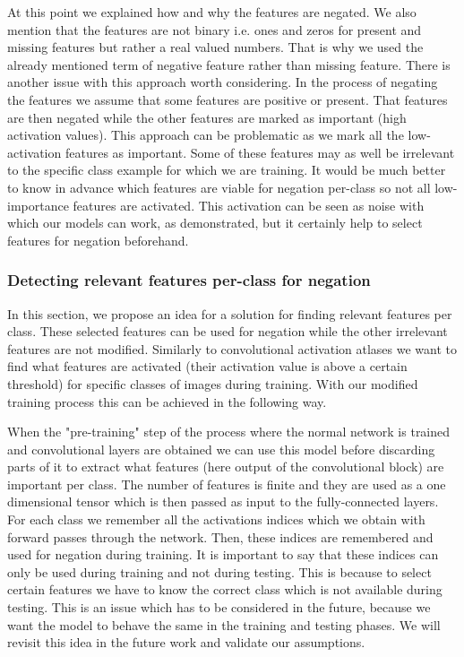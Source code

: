 \documentclass[b5paper]{book}
\begin{document}
At this point we explained how and why the features are negated. We also mention that the features are not binary i.e. ones and zeros for present and missing features but rather a real valued numbers. That is why we used the already mentioned term of negative feature rather than missing feature. There is another issue with this approach worth considering. In the process of negating the features we assume that some features are positive or present. That features are then negated while the other features are marked as important (high activation values). This approach can be problematic as we mark all the low-activation features as important. Some of these features may as well be irrelevant to the specific class example for which we are training. It would be much better to know in advance which features are viable for negation per-class so not all low-importance features are activated. This activation can be seen as noise with which our models can work, as demonstrated, but it certainly help to select features for negation beforehand.  

\subsubsection{Detecting relevant features per-class for negation}

In this section, we propose an idea for a solution for finding relevant features per class. These selected features can be used for negation while the other irrelevant features are not modified. Similarly to convolutional activation atlases we want to find what features are activated (their activation value is above a certain threshold) for specific classes of images during training. With our modified training process this can be achieved in the following way. 

When the "pre-training" step of the process where the normal network is trained and convolutional layers are obtained we can use this model before discarding parts of it to extract what features (here output of the convolutional block) are important per class. The number of features is finite and they are used as a one dimensional tensor which is then passed as input to the fully-connected layers. For each class we remember all the activations indices which we obtain with forward passes through the network. Then, these indices are remembered and used for negation during training. It is important to say that these indices can only be used during training and not during testing. This is because to select certain features we have to know the correct class which is not available during testing. This is an issue which has to be considered in the future, because we want the model to behave the same in the training and testing phases. We will revisit this idea in the future work and validate our assumptions.
\end{document}
